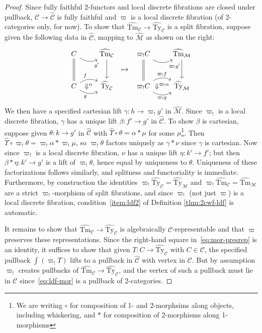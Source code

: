 \documentclass[10pt]{article}
\theoremstyle{definition}
\newcommand\M{\mathcal{M}}
\newcommand\Mhat{\widehat{\mathcal{M}}}
\newcommand\Mtyhat{{\widehat{\mathrm{Ty}}_{\M}}}
\newcommand\Mtmhat{{\widehat{\mathrm{Tm}}_{\M}}}
\newcommand\Upshat{{\widehat{\Upsilon}}}
\newcommand\C{\mathcal{C}}
\newcommand\Chat{{\widehat{\mathcal{C}}}}
\newcommand\Ctyhat{{\widehat{\mathrm{Ty}}}_{\C}}
\newcommand\Ctmhat{{\widehat{\mathrm{Tm}}}_{\C}}
\newcommand\vp{\varpi}
\newcommand\vpsh{\vp_!}
\begin{document}
\begin{proof}
  Since fully faithful 2-functors and local discrete fibrations are closed under pullback, $\C \to \Chat$ is fully faithful and $\vp$ is a local discrete fibration (of 2-categories only, for now).
  To show that $\Ctmhat \to \Ctyhat$ is a split fibration, suppose given the following data in $\Chat$, mapping to $\Mhat$ as shown on the right:
  \begin{equation*}
    \begin{tikzcd}[row sep=large]
      C \ar[d,equals] \ar[r,bend right,near end,"g'"'] & \Ctmhat \ar[d] \ar[dr,phantom,"\mapsto"] &
      \vpsh C \ar[d,equals] \ar[r,bend right,near end,"\vpsh g'"'] & \Mtmhat \ar[d] \\
      C \ar[r,bend left,"f"] \ar[r,bend right,"g"'] \ar[r,phantom,"\Downarrow^\alpha"] & \Ctyhat &
      \vpsh C \ar[r,bend left,"\vpsh f"] \ar[r,bend right,"\vpsh g"'] \ar[r,phantom,"\Downarrow^{\vpsh \alpha}"] & \Mtyhat
    \end{tikzcd}
  \end{equation*}
  We then have a specified cartesian lift $\gamma : h \to \vpsh g'$ in $\Mhat$.
  Since $\vpsh$ is a local discrete fibration, $\gamma$ has a unique lift $\beta : f' \to g'$ in $\Chat$.
  To show $\beta$ is cartesian, suppose given $\theta : k\to g'$ in $\Chat$ with $\Upshat\circ \theta = \alpha *\mu$ for some $\mu$\footnote{We are writing $\circ$ for composition of 1- and 2-morphsims along objects, including whiskering, and $*$ for composition of 2-morphisms along 1-morphisms}.
  Then $\Upshat \circ \vpsh\theta = \vpsh\alpha *\vpsh\mu$, so $\vpsh\theta$ factors uniquely as $\gamma* \nu$ since $\gamma$ is cartesian.
  Now since $\vpsh$ is a local discrete fibration, $\nu$ has a unique lift $\eta : k' \to f'$; but then $\beta*\eta : k' \to g'$ is a lift of $\vpsh\theta$, hence equal by uniqueness to $\theta$.
  Uniqueness of these factorizations follows similarly, and splitness and functoriality is immediate.
  Furthermore, by construction the identities $\vpsh\Ctyhat = \Mtyhat$ and $\vpsh\Ctmhat =\Mtmhat$ are a strict $\vpsh$-morphism of split fibrations, and since $\vpsh$ (not just $\vp$) is a local discrete fibration, condition~\ref{item:ldf2} of Definition \ref{thm:2cwf-ldf} is automatic.

  It remains to show that $\Ctmhat \to \Ctyhat$ is algebraically $\C$-representable and that $\vp$ preserves these representations.
  Since the right-hand square in~\eqref{eq:mor-presrep} is an identity, it suffices to show that given $T:C\to \Ctyhat$ with $C\in \C$, the specified pullback $\int (\vpsh T)$ lifts to a pullback in $\Chat$ with vertex in $\C$.
  But by assumption $\vpsh$ creates pullbacks of $\Ctmhat\to\Ctyhat$, and the vertex of such a pullback must lie in $\C$ since~\eqref{eq:ldf-mor} is a pullback of 2-categories.
\end{proof}
\end{document}
